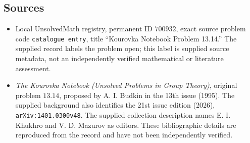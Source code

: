 \documentclass[11pt]{article}
\begin{document}
\subsection{Sources}
\begin{itemize}
\item Local UnsolvedMath registry, permanent ID \(700932\), exact source problem code \texttt{catalogue entry}, title ``Kourovka Notebook Problem 13.14.'' The supplied record labels the problem open; this label is supplied source metadata, not an independently verified mathematical or literature assessment.
\item \emph{The Kourovka Notebook (Unsolved Problems in Group Theory)}, original problem \(13.14\), proposed by A. I. Budkin in the 13th issue (1995). The supplied background also identifies the 21st issue edition (2026), \texttt{arXiv:1401.0300v48}. The supplied collection description names E. I. Khukhro and V. D. Mazurov as editors. These bibliographic details are reproduced from the record and have not been independently verified.
\end{itemize}
\end{document}
